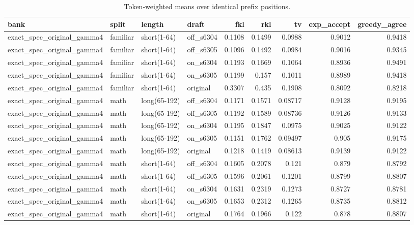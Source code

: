 \begin{table}
\caption{Token-weighted means over identical prefix positions.}
\label{tab:task3_alignment_full}
\begin{tabular}{llllrrrrr}
\toprule
bank & split & length & draft & fkl & rkl & tv & exp\_accept & greedy\_agree \\
\midrule
exact\_spec\_original\_gamma4 & familiar & short(1-64) & off\_s6304 & 0.1108 & 0.1499 & 0.0988 & 0.9012 & 0.9418 \\
exact\_spec\_original\_gamma4 & familiar & short(1-64) & off\_s6305 & 0.1096 & 0.1492 & 0.0984 & 0.9016 & 0.9345 \\
exact\_spec\_original\_gamma4 & familiar & short(1-64) & on\_s6304 & 0.1193 & 0.1669 & 0.1064 & 0.8936 & 0.9491 \\
exact\_spec\_original\_gamma4 & familiar & short(1-64) & on\_s6305 & 0.1199 & 0.157 & 0.1011 & 0.8989 & 0.9418 \\
exact\_spec\_original\_gamma4 & familiar & short(1-64) & original & 0.3307 & 0.435 & 0.1908 & 0.8092 & 0.8218 \\
exact\_spec\_original\_gamma4 & math & long(65-192) & off\_s6304 & 0.1171 & 0.1571 & 0.08717 & 0.9128 & 0.9195 \\
exact\_spec\_original\_gamma4 & math & long(65-192) & off\_s6305 & 0.1192 & 0.1589 & 0.08736 & 0.9126 & 0.9133 \\
exact\_spec\_original\_gamma4 & math & long(65-192) & on\_s6304 & 0.1195 & 0.1847 & 0.0975 & 0.9025 & 0.9122 \\
exact\_spec\_original\_gamma4 & math & long(65-192) & on\_s6305 & 0.1151 & 0.1762 & 0.09497 & 0.905 & 0.9175 \\
exact\_spec\_original\_gamma4 & math & long(65-192) & original & 0.1218 & 0.1419 & 0.08613 & 0.9139 & 0.9122 \\
exact\_spec\_original\_gamma4 & math & short(1-64) & off\_s6304 & 0.1605 & 0.2078 & 0.121 & 0.879 & 0.8792 \\
exact\_spec\_original\_gamma4 & math & short(1-64) & off\_s6305 & 0.1596 & 0.2061 & 0.1201 & 0.8799 & 0.8807 \\
exact\_spec\_original\_gamma4 & math & short(1-64) & on\_s6304 & 0.1631 & 0.2319 & 0.1273 & 0.8727 & 0.8781 \\
exact\_spec\_original\_gamma4 & math & short(1-64) & on\_s6305 & 0.1653 & 0.2312 & 0.1265 & 0.8735 & 0.8812 \\
exact\_spec\_original\_gamma4 & math & short(1-64) & original & 0.1764 & 0.1966 & 0.122 & 0.878 & 0.8807 \\

\end{tabular}
\end{table}
